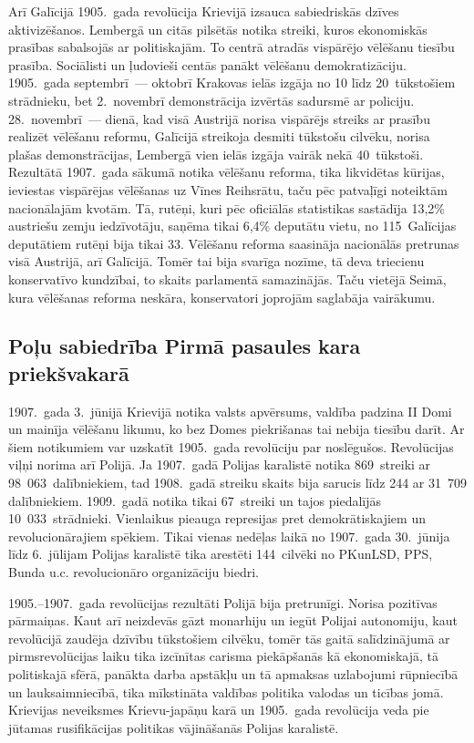 \documentclass[twoside,a5paper,12pt,fleqn,openany]{extbook}
\begin{document}
Arī Galīcijā 1905.~gada revolūcija Krievijā izsauca sabiedriskās dzīves aktivizēšanos. Lembergā un citās pilsētās notika streiki, kuros ekonomiskās prasības sabalsojās ar politiskajām. To centrā atradās vispārējo vēlēšanu tiesību prasība. Sociālisti un ļudovieši centās panākt vēlēšanu demokratizāciju. 1905.~gada septembrī~--- oktobrī Krakovas ielās izgāja no 10 līdz 20~tūkstošiem strādnieku, bet 2.~novembrī demonstrācija izvērtās sadursmē ar policiju. 28.~novembrī~--- dienā, kad visā Austrijā norisa vispārējs streiks ar prasību realizēt vēlēšanu reformu, Galīcijā streikoja desmiti tūkstošu cilvēku, norisa plašas demonstrācijas, Lembergā vien ielās izgāja vairāk nekā 40~tūkstoši. Rezultātā 1907.~gada sākumā notika vēlēšanu reforma, tika likvidētas kūrijas, ieviestas vispārējas vēlēšanas uz Vīnes Reihsrātu, taču pēc patvaļīgi noteiktām nacionālajām kvotām. Tā, rutēņi, kuri pēc oficiālās statistikas sastādīja 13,2\% austriešu zemju iedzīvotāju, saņēma tikai 6,4\% deputātu vietu, no 115~Galīcijas deputātiem rutēņi bija tikai 33. Vēlēšanu reforma saasināja nacionālās pretrunas visā Austrijā, arī Galīcijā. Tomēr tai bija svarīga nozīme, tā deva triecienu konservatīvo kundzībai, to skaits parlamentā samazinājās. Taču vietējā Seimā, kura vēlēšanas reforma neskāra, konservatori joprojām saglabāja vairākumu.

\subsection{Poļu sabiedrība Pirmā pasaules kara priekšvakarā}



1907.~gada 3.~jūnijā Krievijā notika valsts apvērsums, valdība padzina II Domi un mainīja vēlēšanu likumu, ko bez Domes piekrišanas tai nebija tiesību darīt. Ar šiem notikumiem var uzskatīt 1905.~gada revolūciju par noslēgušos. Revolūcijas viļņi norima arī Polijā. Ja 1907.~gadā Polijas karalistē notika 869~streiki ar 98~063~dalībniekiem, tad 1908.~gadā streiku skaits bija sarucis līdz 244 ar 31~709 dalībniekiem. 1909.~gadā notika tikai 67~streiki un tajos piedalījās 10~033~strādnieki. Vienlaikus pieauga represijas pret demokrātiskajiem un revolucionārajiem spēkiem. Tikai vienas nedēļas laikā no 1907.~gada 30.~jūnija līdz 6.~jūlijam Polijas karalistē tika arestēti 144~cilvēki no PKunLSD, PPS, Bunda u.c. revolucionāro organizāciju biedri.

1905.--1907.~gada revolūcijas rezultāti Polijā bija pretrunīgi. Norisa pozitīvas pārmaiņas. Kaut arī neizdevās gāzt monarhiju un iegūt Polijai autonomiju, kaut revolūcijā zaudēja dzīvību tūkstošiem cilvēku, tomēr tās gaitā salīdzinājumā ar pirmsrevolūcijas laiku tika izcīnītas carisma piekāpšanās kā ekonomiskajā, tā politiskajā sfērā, panākta darba apstākļu un tā apmaksas uzlabojumi rūpniecībā un lauksaimniecībā, tika mīkstināta valdības politika valodas un ticības jomā. Krievijas neveiksmes Krievu-japāņu karā un 1905.~gada revolūcija veda pie jūtamas rusifikācijas politikas vājināšanās Polijas karalistē.
\end{document}
